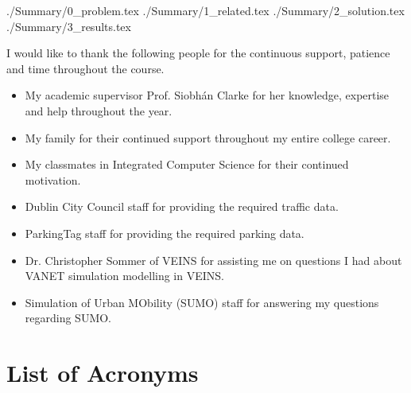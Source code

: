 \documentclass[a4paper, 11pt, oneside]{report}
\begin{document}
\thesistitlepage
\thesisdeclarationpage

\begin{thesissummary}
{./Summary/0_problem.tex}
{./Summary/1_related.tex}
{./Summary/2_solution.tex}
{./Summary/3_results.tex}
\end{thesissummary}

\begin{thesisabstract}
\end{thesisabstract}

\begin{thesisacknowledgments}
I would like to thank the following people for the continuous support, patience and time throughout the course.
\begin{itemize}
    \setlength\itemsep{0em}
    \item My academic supervisor Prof. Siobhán Clarke for her knowledge, expertise and help throughout the year.
    \item My family for their continued support throughout my entire college career.
    \item My classmates in Integrated Computer Science for their continued motivation.
    \item Dublin City Council staff for providing the required traffic data.
    \item ParkingTag staff for providing the required parking data.
    \item Dr. Christopher Sommer of VEINS for assisting me on questions I had about \ac{VANET} simulation modelling in VEINS.
    \item Simulation of Urban MObility (SUMO) staff for answering my questions regarding SUMO.
\end{itemize}
\end{thesisacknowledgments}

\pagebreak

\tableofcontents                                  %
\listoftables                                     %
\listoffigures                                    %

\pagebreak

\section*{List of Acronyms}
\begin{acronym}
\end{acronym}
  
  
  
  
  
  
\end{document}
